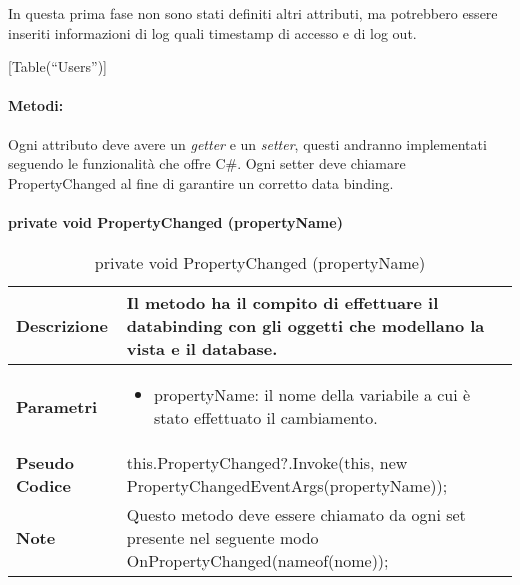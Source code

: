 In questa prima fase non sono stati definiti altri attributi, ma potrebbero essere inseriti informazioni di log quali timestamp di accesso e di log out.  

[Table(“Users”)]\\

\paragraph{Metodi:}

Ogni attributo deve avere un \emph{getter} e un \emph{setter}, questi andranno implementati seguendo le funzionalità che offre C\#. Ogni setter deve chiamare PropertyChanged al fine di garantire un corretto data binding.

\paragraph{private void PropertyChanged (propertyName)}
        \begin{center}
            \begin{longtable}{|p{3cm}|p{9cm}|}%
            \caption{private void PropertyChanged (propertyName)}
            \endfirsthead
            \endhead
            \hline
            \textbf{Descrizione} & Il metodo ha il compito di effettuare il databinding con gli oggetti che modellano la vista e il database.\\
            \hline
            \textbf{Parametri} &      
            \begin{itemize}
                \item propertyName: il nome della variabile a cui è stato effettuato il cambiamento.
            \end{itemize}
            \\
            \hline
            \textbf{Pseudo Codice} & 
            this.PropertyChanged?.Invoke(this, 
                new PropertyChangedEventArgs(propertyName));\newline
            \\
            \hline
            \textbf{Note} & 
            Questo metodo deve essere chiamato da ogni set presente nel seguente modo 
            OnPropertyChanged(nameof(nome));
            \\
            \hline
            \end{longtable}
            \end{center}


